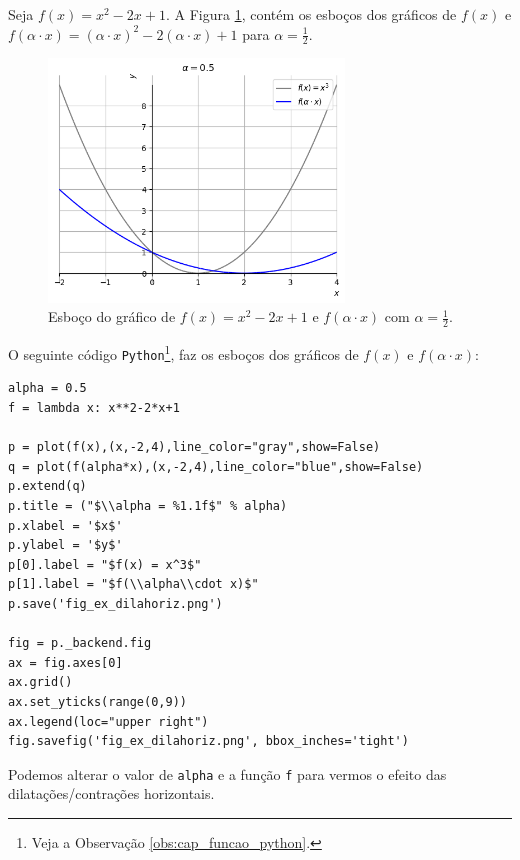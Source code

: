 \begin{ex}
  Seja $f(x) = x^2-2x+1$. A Figura \ref{fig:ex_dilahoriz}, contém os esboços dos gráficos de $f(x)$ e $f(\alpha\cdot x) = (\alpha \cdot x)^2-2(\alpha\cdot x) + 1$ para $\alpha = \frac{1}{2}$.

  \begin{figure}[H]
    \centering
    \includegraphics[width=0.7\textwidth]{./cap_funcao/dados/fig_ex_dilahoriz/fig_ex_dilahoriz}
    \caption{Esboço do gráfico de $f(x) = x^2-2x+1$ e $f(\alpha\cdot x)$ com $\alpha=\frac{1}{2}$.}
    \label{fig:ex_dilahoriz}
  \end{figure}

  \ifispython
  O seguinte código \verb+Python+\footnote{Veja a Observação \ref{obs:cap_funcao_python}.}, faz os esboços dos gráficos de $f(x)$ e $f(\alpha\cdot x)$:
\begin{verbatim}
alpha = 0.5
f = lambda x: x**2-2*x+1

p = plot(f(x),(x,-2,4),line_color="gray",show=False)
q = plot(f(alpha*x),(x,-2,4),line_color="blue",show=False)
p.extend(q)
p.title = ("$\\alpha = %1.1f$" % alpha)
p.xlabel = '$x$'
p.ylabel = '$y$'
p[0].label = "$f(x) = x^3$"
p[1].label = "$f(\\alpha\\cdot x)$"
p.save('fig_ex_dilahoriz.png')

fig = p._backend.fig
ax = fig.axes[0]
ax.grid()
ax.set_yticks(range(0,9))
ax.legend(loc="upper right")
fig.savefig('fig_ex_dilahoriz.png', bbox_inches='tight')
\end{verbatim}
  Podemos alterar o valor de \verb+alpha+ e a função \verb+f+ para vermos o efeito das dilatações/contrações horizontais.
  \fi
\end{ex}


